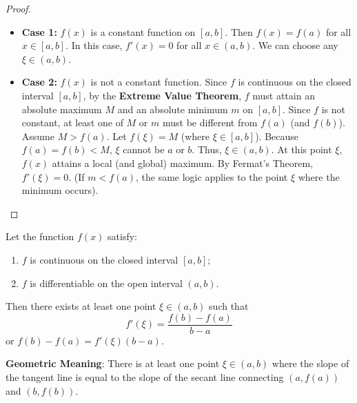 \begin{proof}
\begin{itemize}
    \item \textbf{Case 1:} $f(x)$ is a constant function on $[a, b]$.
    Then $f(x) = f(a)$ for all $x \in [a, b]$.
    In this case, $f'(x) = 0$ for all $x \in (a, b)$. We can choose any $\xi \in (a, b)$.
    
    \item \textbf{Case 2:} $f(x)$ is not a constant function.
    Since $f$ is continuous on the closed interval $[a, b]$, by the \textbf{Extreme Value Theorem}, $f$ must attain an absolute maximum $M$ and an absolute minimum $m$ on $[a, b]$.
    Since $f$ is not constant, at least one of $M$ or $m$ must be different from $f(a)$ (and $f(b)$).
    Assume $M > f(a)$. Let $f(\xi) = M$ (where $\xi \in [a, b]$).
    Because $f(a) = f(b) < M$, $\xi$ cannot be $a$ or $b$.
    Thus, $\xi \in (a, b)$.
    At this point $\xi$, $f(x)$ attains a local (and global) maximum.
    By Fermat's Theorem, $f'(\xi) = 0$.
    (If $m < f(a)$, the same logic applies to the point $\xi$ where the minimum occurs).
\end{itemize}
\end{proof}

\begin{theorem}
\label{thm:lagrange_en}
Let the function $f(x)$ satisfy:
\begin{enumerate}
    \item $f$ is continuous on the closed interval $[a, b]$;
    \item $f$ is differentiable on the open interval $(a, b)$.
\end{enumerate}
Then there exists at least one point $\xi \in (a, b)$ such that
\[
f'(\xi) = \frac{f(b) - f(a)}{b - a}
\]
or $f(b) - f(a) = f'(\xi)(b - a)$.
\end{theorem}

\textbf{Geometric Meaning}: There is at least one point $\xi \in (a, b)$ where the slope of the tangent line is equal to the slope of the secant line connecting $(a, f(a))$ and $(b, f(b))$.

